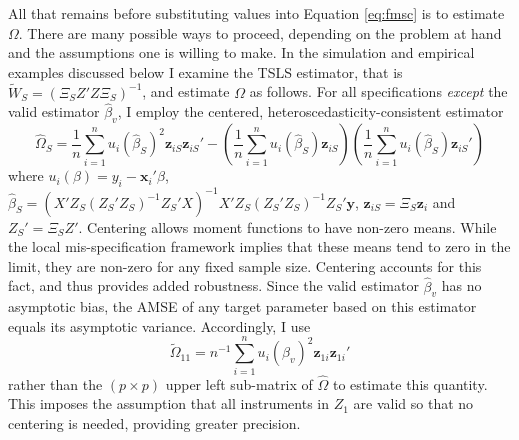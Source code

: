 All that remains before substituting values into Equation \ref{eq:fmsc} is to estimate $\Omega$. 
There are many possible ways to proceed, depending on the problem at hand and the assumptions one is willing to make. 
In the simulation and empirical examples discussed below I examine the TSLS estimator, that is $\widetilde{W}_S = (\Xi_S Z'Z\Xi_S)^{-1}$, and estimate $\Omega$ as follows. 
For all specifications \emph{except} the valid estimator $\widehat{\beta}_v$, I employ the centered, heteroscedasticity-consistent estimator
\begin{equation}
	\widehat{\Omega}_S = \frac{1}{n}\sum_{i=1}^n u_i(\widehat{\beta}_S)^2\mathbf{z}_{iS} \mathbf{z}_{iS}'  - \left(\frac{1}{n}\sum_{i=1}^n u_i(\widehat{\beta}_S)\mathbf{z}_{iS}   \right)\left(\frac{1}{n}\sum_{i=1}^n  u_i(\widehat{\beta}_S)\mathbf{z}_{iS}'  \right)
\end{equation}
where $u_i(\beta) = y_i - \mathbf{x}_i'\beta$, $\widehat{\beta}_S = (X'Z_S(Z_S'Z_S)^{-1}Z_S'X)^{-1}X'Z_S(Z_S'Z_S)^{-1}Z_S'\mathbf{y}$, $\mathbf{z}_{iS} = \Xi_S \mathbf{z}_i$ and $Z_S' = \Xi_S Z'$.
Centering allows moment functions to have non-zero means. 
While the local mis-specification framework implies that these means tend to zero in the limit, they are non-zero for any fixed sample size. 
Centering accounts for this fact, and thus provides added robustness. 
Since the valid estimator $\widehat{\beta}_v$ has no asymptotic bias, the AMSE of any target parameter based on this estimator equals its asymptotic variance. 
Accordingly, I use 
\begin{equation}
	\widetilde{\Omega}_{11}= n^{-1}\sum_{i=1}^n u_i(\widehat{\beta}_v)^2\mathbf{z}_{1i}\mathbf{z}_{1i}'
\end{equation}
rather than the $(p\times p)$ upper left sub-matrix of $\widehat{\Omega}$ to estimate this quantity. 
This imposes the assumption that all instruments in $Z_1$ are valid so that no centering is needed, providing greater precision.